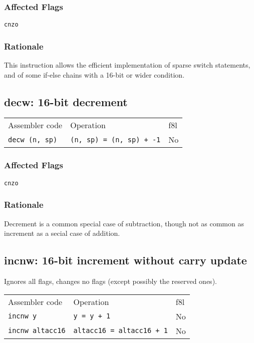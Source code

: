 \documentclass{book}
\begin{document}
\subsubsection*{Affected Flags}

\texttt{cnzo}

\subsubsection*{Rationale}

This instruction allows the efficient implementation of sparse switch statements, and of some if-else chains with a 16-bit or wider condition.


\subsection{decw: 16-bit decrement}

\begin{tabular}{l l l}
Assembler code        & Operation                       & f8l \\
\texttt{decw (n, sp)} & \texttt{(n, sp) = (n, sp) + -1} & No \\
\end{tabular}

\subsubsection*{Affected Flags}

\texttt{cnzo}

\subsubsection*{Rationale}

Decrement is a common special case of subtraction, though not as common as increment as a secial case of addition.


\subsection{incnw: 16-bit increment without carry update}

Ignores all flags, changes no flags (except possibly the reserved ones).

\begin{tabular}{l l l}
Assembler code          & Operation                        & f8l \\
\texttt{incnw y}        & \texttt{y = y + 1}               & No \\
\texttt{incnw altacc16} & \texttt{altacc16 = altacc16 + 1} & No \\
\end{tabular}
\end{document}
